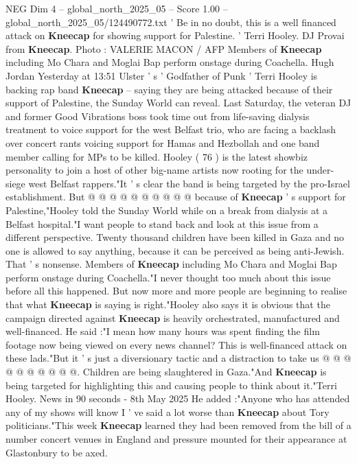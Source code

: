 \begin{textsample}{NEG Dim 4 – global\_north\_2025\_05 – Score 1.00 – global\_north\_2025\_05/124490772.txt}  \label{ex:f4_neg_266}
' Be in no doubt, this is a well financed attack on \textbf{Kneecap} for showing support for Palestine. ' Terri Hooley.
DJ Provai from \textbf{Kneecap}.
Photo : VALERIE MACON / AFP Members of \textbf{Kneecap} including Mo Chara and Moglai Bap perform onstage during Coachella.
Hugh Jordan Yesterday at 13:51 Ulster ' s ' Godfather of Punk ' Terri Hooley is backing rap band \textbf{Kneecap} -- saying they are being attacked because of their support of Palestine, the Sunday World can reveal.
Last Saturday, the veteran DJ and former Good Vibrations boss took time out from life-saving dialysis treatment to voice support for the west Belfast trio, who are facing a backlash over concert rants voicing support for Hamas and Hezbollah and one band member calling for MPs to be killed.
Hooley ( 76 ) is the latest showbiz personality to join a host of other big-name artists now rooting for the under-siege west Belfast rappers."It ' s clear the band is being targeted by the pro-Israel establishment.
But @ @ @ @ @ @ @ @ @ @ because of \textbf{Kneecap} ' s support for Palestine,"Hooley told the Sunday World while on a break from dialysis at a Belfast hospital."I want people to stand back and look at this issue from a different perspective.
Twenty thousand children have been killed in Gaza and no one is allowed to say anything, because it can be perceived as being anti-Jewish.
That ' s nonsense.
Members of \textbf{Kneecap} including Mo Chara and Moglai Bap perform onstage during Coachella."I never thought too much about this issue before all this happened.
But now more and more people are beginning to realise that what \textbf{Kneecap} is saying is right."Hooley also says it is obvious that the campaign directed against \textbf{Kneecap} is heavily orchestrated, manufactured and well-financed.
He said :"I mean how many hours was spent finding the film footage now being viewed on every news channel?
This is well-financed attack on these lads."But it ' s just a diversionary tactic and a distraction to take us @ @ @ @ @ @ @ @ @ @.
Children are being slaughtered in Gaza."And \textbf{Kneecap} is being targeted for highlighting this and causing people to think about it."Terri Hooley.
News in 90 seconds - 8th May 2025 He added :"Anyone who has attended any of my shows will know I ' ve said a lot worse than \textbf{Kneecap} about Tory politicians."This week \textbf{Kneecap} learned they had been removed from the bill of a number concert venues in England and pressure mounted for their appearance at Glastonbury to be axed.

\end{textsample}
